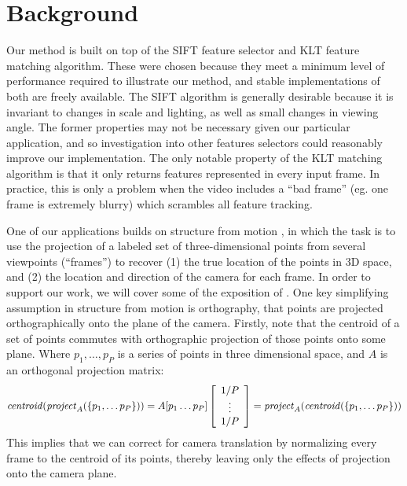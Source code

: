 \section{Background}

Our method is built on top of the SIFT \cite{sift} feature selector and KLT \cite{klt} feature matching algorithm.  These were chosen because they meet a minimum level of performance required to illustrate our method, and stable implementations of both are freely available.  The SIFT algorithm is generally desirable because it is invariant to changes in scale and lighting, as well as small changes in viewing angle.  The former properties may not be necessary given our particular application, and so investigation into other features selectors could reasonably improve our implementation.  The only notable property of the KLT matching algorithm is that it only returns features represented in every input frame.  In practice, this is only a problem when the video includes a ``bad frame'' (eg. one frame is extremely blurry) which scrambles all feature tracking.

One of our applications builds on structure from motion \cite{sfm}, in which the task is to use the projection of a labeled set of three-dimensional points from several viewpoints (``frames'') to recover (1) the true location of the points in 3D space, and (2) the location and direction of the camera for each frame.  In order to support our work, we will cover some of the exposition of \cite{sfm}. One key simplifying assumption in structure from motion is orthography, that points are projected orthographically onto the plane of the camera.  Firstly, note that the centroid of a set of points commutes with orthographic projection of those points onto some plane.  Where $p_1, \ldots, p_P$ is a series of points in three dimensional space, and $A$ is an orthogonal projection matrix:
\[
{\it centroid}({\it project}_A (\{p_1, \ldots p_P\})) = A[p_1 \ldots p_P]\left[\begin{array}{c}1/P \\ \vdots \\ 1/P\end{array}\right] ={\it project}_A({\it centroid} (\{p_1, \ldots p_P\}))
\]
This implies that we can correct for camera translation by normalizing every frame to the centroid of its points, thereby leaving only the effects of projection onto the camera plane.  